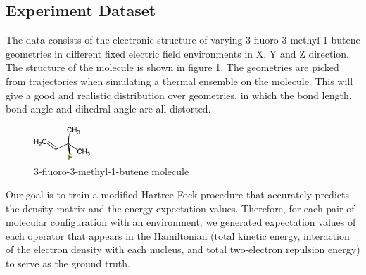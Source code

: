 \documentclass[twoside]{article}
\begin{document}
\subsection{Experiment Dataset}

The data consists of the electronic structure of varying 3-fluoro-3-methyl-1-butene geometries in different fixed electric field environments in X, Y and Z direction. The structure of the molecule is shown in figure \ref{fig:molecule}. The geometries are picked from trajectories when simulating a thermal ensemble on the molecule. This will give a good and realistic distribution over geometries, in which the bond length, bond angle and dihedral angle are all distorted. 

\begin{figure}[h!]
  \caption{3-fluoro-3-methyl-1-butene molecule}
    \label{fig:molecule}
    \centerline{\includegraphics[width=80px]{3-fluoro-3-methyl-1-butene.png}}
\end{figure}


 




Our goal is to train a modified Hartree-Fock procedure that accurately predicts the density matrix and the energy expectation values. Therefore, for each pair of molecular configuration with an environment, we generated expectation values of each operator that appears in the Hamiltonian (total kinetic energy, interaction of the electron density with each nucleus, and total two-electron repulsion energy) to serve as the ground truth. 
\end{document}

